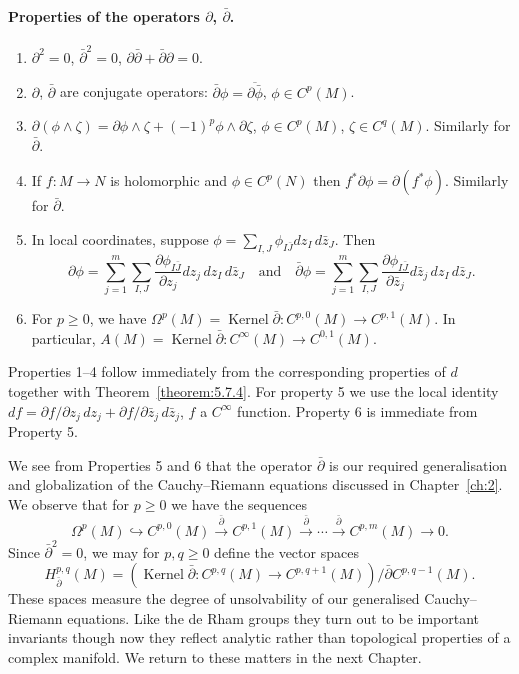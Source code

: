 \paragraph{Properties of the operators $\partial$, $\bar\partial$.}
\begin{enumerate}
\item $\partial^2=0$, $\bar\partial^2=0$, $\partial\bar\partial+\bar\partial\partial=0$.
\item $\partial$, $\bar\partial$ are conjugate operators: $\bar\partial\phi=\overline{\partial\bar\phi}$, $\phi\in C^p(M)$.
\item $\partial(\phi\wedge\zeta)=\partial\phi\wedge\zeta+(-1)^p\phi\wedge\partial\zeta$, $\phi\in C^p(M)$, $\zeta\in C^q(M)$. Similarly for $\bar\partial$.
\item If $f:M\to N$ is holomorphic and $\phi\in C^p(N)$ then $f^*\partial\phi=\partial(f^*\phi)$. Similarly for $\bar\partial$.
\item In local coordinates, suppose $\phi=\sum_{I,J}\phi_{I\bar J}dz_I\,d\bar z_J$. Then
\[\partial\phi=\sum_{j=1}^m\sum_{I,J}\frac{\partial\phi_{I\bar J}}{\partial z_j}dz_j\,dz_I\,d\bar z_J\quad\text{and}\quad\bar\partial\phi=\sum_{j=1}^m\sum_{I,J}\frac{\partial\phi_{I\bar J}}{\partial\bar z_j}d\bar z_j\,dz_I\,d\bar z_J.\]
\item For $p\geq0$, we have $\Omega^p(M)=\operatorname{Kernel}\bar\partial:C^{p,0}(M)\to C^{p,1}(M)$. In particular, $A(M)=\operatorname{Kernel}\bar\partial:C^\infty(M)\to C^{0,1}(M)$.
\end{enumerate}
Properties 1--4 follow immediately from the corresponding properties of $d$ together with Theorem~\ref{theorem:5.7.4}. For property 5 we use the local identity $df=\partial f/\partial z_j\,dz_j+\partial f/\partial\bar z_j\,d\bar z_j$, $f$ a $C^\infty$ function. Property 6 is immediate from Property 5.

We see from Properties 5 and 6 that the operator $\bar\partial$ is our required generalisation and globalization of the Cauchy--Riemann equations discussed in Chapter~\ref{ch:2}. We observe that for $p\geq0$ we have the sequences
\[\Omega^p(M)\hookrightarrow C^{p,0}(M)\xrightarrow{\bar\partial}C^{p,1}(M)\xrightarrow{\bar\partial}\cdots\xrightarrow{\bar\partial}C^{p,m}(M)\to0.\]
Since $\bar\partial^2=0$, we may for $p,q\geq0$ define the vector spaces
\[H_{\bar\partial}^{p,q}(M)=(\operatorname{Kernel}\bar\partial:C^{p,q}(M)\to C^{p,q+1}(M))/\bar\partial C^{p,q-1}(M).\]
These spaces measure the degree of unsolvability of our generalised Cauchy--Riemann equations. Like the de Rham groups they turn out to be important invariants though now they reflect analytic rather than topological properties of a complex manifold. We return to these matters in the next Chapter.
